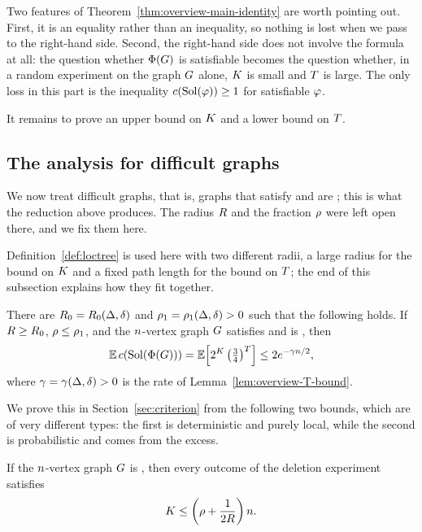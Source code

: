 Two features of Theorem~\ref{thm:overview-main-identity} are worth pointing
out. First, it is an equality rather than an inequality, so nothing is lost
when we pass to the right-hand side. Second, the right-hand side does not
involve the formula at all: the question whether \(\Phi(G)\) is
satisfiable becomes the question whether, in a random experiment on the graph
\(G\) alone, \(K\) is small and \(T\) is large. The only loss in
this part is the inequality \(c(\operatorname{Sol}(\varphi))\ge1\) for satisfiable \(\varphi\).

It remains to prove an upper bound on \(K\) and a lower bound on \(T\).

\subsection{The analysis for difficult graphs}\label{subsec:overview-three-conditions}

We now treat difficult graphs, that is, graphs that satisfy \Hyp{} and are
\loctree{\rad}{\nontree}; this is what the reduction above produces. The radius
\(R\) and the fraction \(\rho\) were left open there, and we fix them
here.

Definition~\ref{def:loctree} is used here with two different radii, a large
radius for the bound on \(K\) and a fixed path length for the bound on
\(T\); the end of this subsection explains how they fit together.

\begin{theorem}\label{thm:overview-three-conditions}
There are \(R_0=R_0(\Delta,\delta)\) and \(\rho_1=\rho_1(\Delta,\delta)>0\)
such that the following holds. If \(R\ge R_0\), \(\rho\le\rho_1\), and
the \(n\)-vertex graph \(G\) satisfies \Hyp{} and is
\loctree{\rad}{\nontree}, then
\[
  \E\,\solcomp{\rform{\Gin}}
  =\Ex{2^{\Kdef}\left(\tfrac34\right)^{\Tdef}}
  \le 2e^{-\rate\nvert/2},
\]
where \(\gamma=\gamma(\Delta,\delta)>0\) is the rate of
Lemma~\ref{lem:overview-T-bound}.
\end{theorem}

We prove this in Section~\ref{sec:criterion} from the following two bounds,
which are of very different types: the first is deterministic and purely local,
while the second is probabilistic and comes from the excess.

\begin{lemma}\label{lem:overview-K-bound}
If the \(n\)-vertex graph \(G\) is \loctree{\rad}{\nontree}, then
every outcome of the deletion experiment satisfies
\[
  K\le\left(\rho+\frac{1}{2R}\right)n .
\]
\end{lemma}

